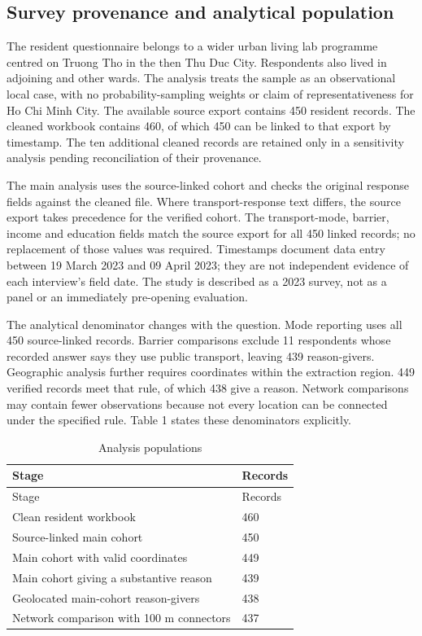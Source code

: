 \documentclass[
  11pt,
  a4paper,
]{article}
\begin{document}
\subsection{Survey provenance and analytical
population}\label{survey-provenance-and-analytical-population}

The resident questionnaire belongs to a wider urban living lab programme
centred on Truong Tho in the then Thu Duc City. Respondents also lived
in adjoining and other wards. The analysis treats the sample as an
observational local case, with no probability-sampling weights or claim
of representativeness for Ho Chi Minh City. The available source export
contains 450 resident records. The cleaned workbook contains 460, of
which 450 can be linked to that export by timestamp. The ten additional
cleaned records are retained only in a sensitivity analysis pending
reconciliation of their provenance.

The main analysis uses the source-linked cohort and checks the original
response fields against the cleaned file. Where transport-response text
differs, the source export takes precedence for the verified cohort. The
transport-mode, barrier, income and education fields match the source
export for all 450 linked records; no replacement of those values was
required. Timestamps document data entry between 19 March 2023 and 09
April 2023; they are not independent evidence of each interview's field
date. The study is described as a 2023 survey, not as a panel or an
immediately pre-opening evaluation.

The analytical denominator changes with the question. Mode reporting
uses all 450 source-linked records. Barrier comparisons exclude 11
respondents whose recorded answer says they use public transport,
leaving 439 reason-givers. Geographic analysis further requires
coordinates within the extraction region. 449 verified records meet that
rule, of which 438 give a reason. Network comparisons may contain fewer
observations because not every location can be connected under the
specified rule. Table 1 states these denominators explicitly.

\begin{longtable}[]{@{}ll@{}}
\caption{Analysis populations}\tabularnewline
\toprule\noalign{}
Stage & Records \\
\midrule\noalign{}
\endfirsthead
\toprule\noalign{}
Stage & Records \\
\midrule\noalign{}
\endhead
\bottomrule\noalign{}
\endlastfoot
Clean resident workbook & 460 \\
Source-linked main cohort & 450 \\
Main cohort with valid coordinates & 449 \\
Main cohort giving a substantive reason & 439 \\
Geolocated main-cohort reason-givers & 438 \\
Network comparison with 100 m connectors & 437 \\
\end{longtable}
\end{document}
